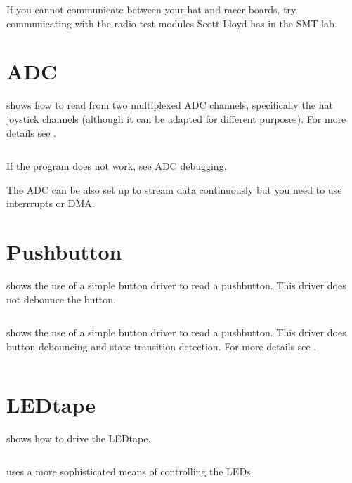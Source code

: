 If you cannot communicate between your hat and racer boards, try
communicating with the radio test modules Scott Lloyd has in the SMT
lab.


\section{ADC}
\label{ADC}

 shows
how to read from two multiplexed ADC channels, specifically the hat joystick
channels (although it can be adapted for different purposes).  For more details
see .

\inputminted{C}{../../src/test-apps/adc_usb_serial_test2/adc_usb_serial_test2.c}

If the program does not work, see  \hyperref[debugging-adc]{ADC debugging}.

The ADC can be also set up to stream data continuously but you need to
use interrrupts or DMA.


\section{Pushbutton}
\label{pushbutton}

 shows the use of a
simple button driver to read a pushbutton.  This driver does not debounce the button.

\inputminted{C}{../../src/test-apps/button_test1/button_test1.c}

 shows the use of a
simple button driver to read a pushbutton.  This driver does button
debouncing and state-transition detection.  For more details see
.

\inputminted{C}{../../src/test-apps/button_test2/button_test2.c}


\section{LEDtape}
\label{ledtape}

 shows how to drive the
LEDtape.

\inputminted{C}{../../src/test-apps/ledtape_test1/ledtape_test1.c}


 uses a more
sophisticated means of controlling the LEDs.

\inputminted{C}{../../src/test-apps/ledtape_test2/ledtape_test2.c}
